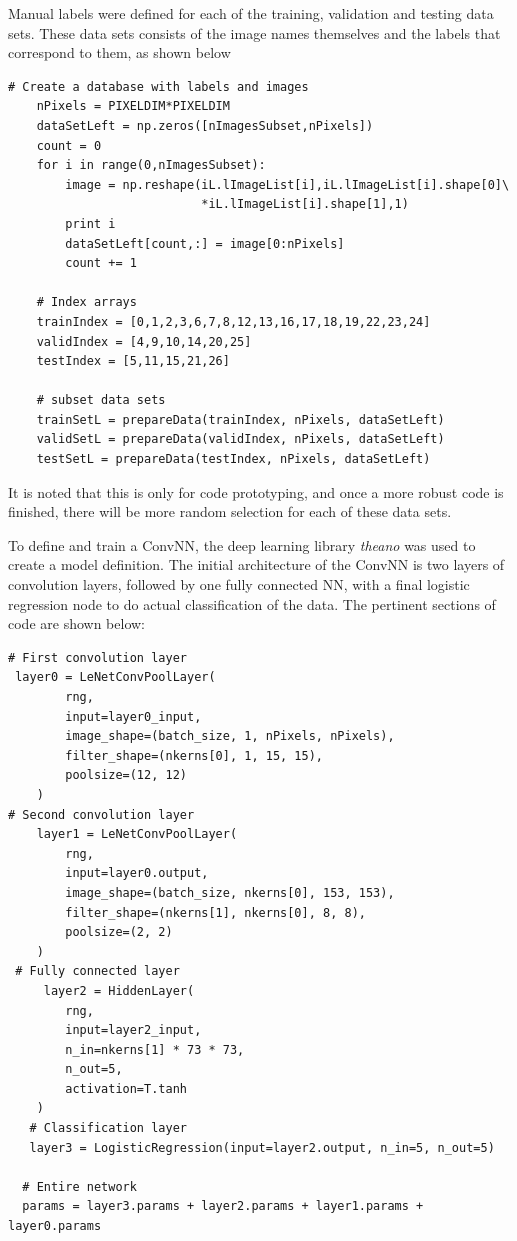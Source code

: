 \documentclass[letterpaper,12pt]{article}
\begin{document}
Manual labels were defined for each of the training, validation and testing data sets.  These data sets consists of the image names themselves and the labels that correspond to them, as shown below

\begin{verbatim}
# Create a database with labels and images
    nPixels = PIXELDIM*PIXELDIM
    dataSetLeft = np.zeros([nImagesSubset,nPixels])
    count = 0 
    for i in range(0,nImagesSubset):
        image = np.reshape(iL.lImageList[i],iL.lImageList[i].shape[0]\
                           *iL.lImageList[i].shape[1],1)
        print i
        dataSetLeft[count,:] = image[0:nPixels]
        count += 1
        
    # Index arrays
    trainIndex = [0,1,2,3,6,7,8,12,13,16,17,18,19,22,23,24]
    validIndex = [4,9,10,14,20,25]
    testIndex = [5,11,15,21,26]
    
    # subset data sets
    trainSetL = prepareData(trainIndex, nPixels, dataSetLeft)
    validSetL = prepareData(validIndex, nPixels, dataSetLeft)
    testSetL = prepareData(testIndex, nPixels, dataSetLeft)
\end{verbatim}
It is noted that this is only for code prototyping, and once a more robust code is finished, there will be more random selection for each of these data sets.

To define and train a ConvNN, the deep learning library \textit{theano} was used to create a model definition. The initial architecture of the ConvNN is two layers of convolution layers, followed by one fully connected NN, with a final logistic regression node to do actual classification of the data. The pertinent sections of code are shown below:

\begin{verbatim}
# First convolution layer
 layer0 = LeNetConvPoolLayer(
        rng,
        input=layer0_input,
        image_shape=(batch_size, 1, nPixels, nPixels),
        filter_shape=(nkerns[0], 1, 15, 15),
        poolsize=(12, 12)
    )
# Second convolution layer
    layer1 = LeNetConvPoolLayer(
        rng,
        input=layer0.output,
        image_shape=(batch_size, nkerns[0], 153, 153),
        filter_shape=(nkerns[1], nkerns[0], 8, 8),
        poolsize=(2, 2)
    )
 # Fully connected layer
     layer2 = HiddenLayer(
        rng,
        input=layer2_input,
        n_in=nkerns[1] * 73 * 73,
        n_out=5,
        activation=T.tanh
    )
   # Classification layer
   layer3 = LogisticRegression(input=layer2.output, n_in=5, n_out=5)
   
  # Entire network 
  params = layer3.params + layer2.params + layer1.params + layer0.params
\end{verbatim}
\end{document}

